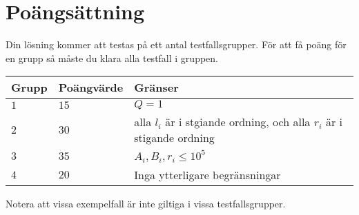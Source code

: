 \section*{Poängsättning}
Din lösning kommer att testas på ett antal testfallsgrupper.
För att få poäng för en grupp så måste du klara alla testfall i gruppen.

\noindent
\begin{tabular}{| l | l | l |}
  \hline
  Grupp & Poängvärde & Gränser \\ \hline
  $1$   & $15$        & $Q=1$  \\ \hline
  $2$   & $30$       & alla $l_i$ är i stgiande ordning, och alla $r_i$ är i stigande ordning \\ \hline
  $3$   & $35$       & $ A_i,B_i,r_i \leq 10^5$ \\ \hline
  $4$   & $20$       & Inga ytterligare begränsningar \\ \hline
\end{tabular}

Notera att vissa exempelfall är inte giltiga i vissa testfallsgrupper.

